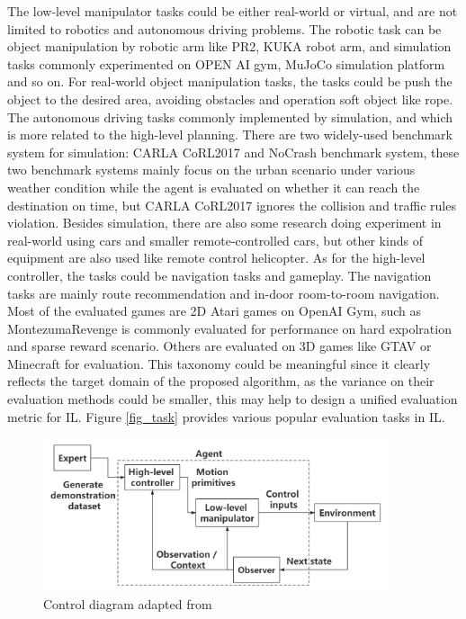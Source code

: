 \documentclass[acmsmall]{acmart}
\begin{document}
The low-level manipulator tasks could be either real-world or virtual, and are not limited to robotics and autonomous driving problems. The robotic task can be object manipulation by robotic arm like PR2, KUKA robot arm, and simulation tasks commonly experimented on OPEN AI gym, MuJoCo simulation platform and so on. For real-world object manipulation tasks, the tasks could be push the object to the desired area, avoiding obstacles and operation soft object like rope. The autonomous driving tasks commonly implemented by simulation, and which is more related to the high-level planning. There are two widely-used benchmark system for simulation: CARLA CoRL2017 and NoCrash benchmark system, these two benchmark systems mainly focus on the urban scenario under various weather condition while the agent is evaluated on whether it can reach the destination on time, but CARLA CoRL2017 ignores the collision and traffic rules violation. Besides simulation, there are also some research doing experiment in real-world using cars\cite{zhouModelingCarFollowingBehaviors2020} and smaller remote-controlled cars\cite{codevillaEndtoEndDrivingConditional2018}, but other kinds of equipment are also used like remote control helicopter\cite{abbeelAutonomousHelicopterAerobatics2010}.
As for the high-level controller, the tasks could be navigation tasks and gameplay. The navigation tasks are mainly route recommendation and in-door room-to-room navigation. Most of the evaluated games are 2D Atari games on OpenAI Gym, such as MontezumaRevenge is commonly evaluated for performance on hard expolration and sparse reward scenario. Others are evaluated on 3D games like GTAV or Minecraft for evaluation. This taxonomy could be meaningful since it clearly reflects the target domain of the proposed algorithm, as the variance on their evaluation methods could be smaller, this may help to design a unified evaluation metric for IL. Figure \ref{fig_task} provides various popular evaluation tasks in IL. 

\begin{figure}[t]
      \centering
      \includegraphics[width=0.9\textwidth]{high_low.png}
      \caption{\textnormal{Control diagram adapted from \protect\cite{osaAlgorithmicPerspectiveImitation2018}}}
      \label{fig_h_l}
   \end{figure}
   
\end{document}
